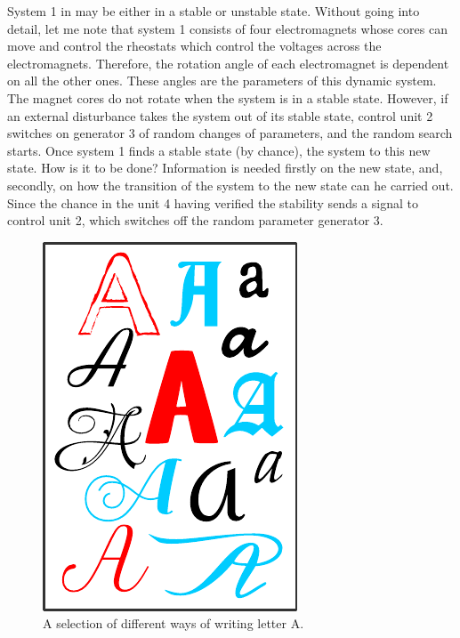 System 1 in  may be either in a stable or unstable state.
Without going into detail, let me note that system 1 consists of four
electromagnets whose cores can move and control the rheostats which
control the voltages across the electromagnets. Therefore, the rotation
angle of each electromagnet is dependent on all the other ones. These
angles are the parameters of this dynamic system. The magnet cores do
not rotate when the system is in a stable state. However, if an external
disturbance takes the system out of its stable state, control unit
2 switches on generator 3 of random changes of parameters, and the
random search starts. Once system 1 finds a stable state (by chance),
the system to this new state. How is it to be done? Information is
needed firstly on the new state, and, secondly, on how the transition of
the system to the new state can he carried out. Since the chance in the
unit 4 having verified the stability sends a signal to control unit 2, which
switches off the random parameter generator 3.
\begin{figure}%
 \centering
 \includegraphics[width=0.9\linewidth]{figures/fonts.pdf}
\caption{A selection of different ways of writing letter A.}
\label{fonts}
 \end{figure}
